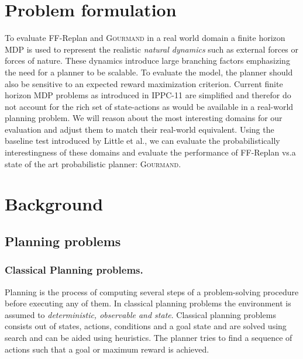 \documentclass[runningheads,a4paper]{llncs}
\begin{document}

\section{Problem formulation}

To evaluate FF-Replan and \textsc{Gourmand} in a real world domain a finite horizon MDP is used to represent the realistic \emph{natural dynamics} such as external forces or forces of nature. These dynamics introduce large branching factors emphasizing the need for a planner to be scalable. To evaluate the model, the planner should also be sensitive to an expected reward maximization criterion.
Current finite horizon MDP problems as introduced in IPPC-11 are simplified and therefor do not account for the rich set of state-actions as would be available in a real-world planning problem. We will reason about the most interesting domains for our evaluation and adjust them to match their real-world equivalent. Using the baseline test introduced by Little et al.\@ \cite{little2007probvsreplan}, we can evaluate the probabilistically interestingness of these domains and evaluate the performance of FF-Replan vs.\@ a state of the art probabilistic planner: \textsc{Gourmand}.




\section{Background}
\label{sec:background}

\subsection{Planning problems}
\subsubsection{Classical Planning problems. } Planning is the process of computing several steps of a problem-solving procedure before executing any of them. In classical planning problems the environment is assumed to \emph{deterministic, observable and state}. Classical planning problems consists out of states, actions, conditions and a goal state and are solved using search and can be aided using heuristics. The planner tries to find a sequence of actions such that a goal or maximum reward is achieved.
\end{document}

